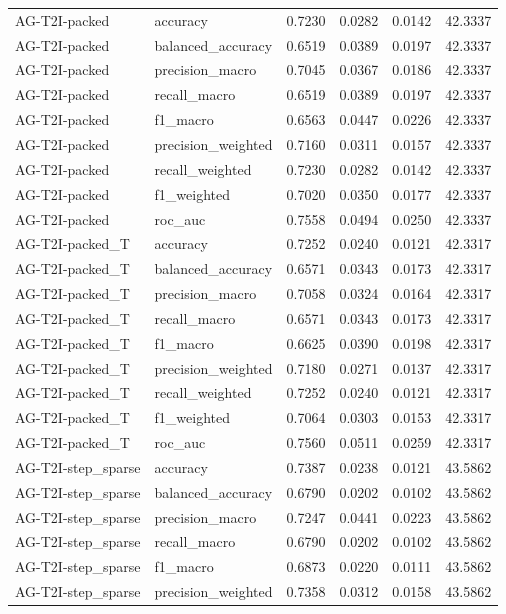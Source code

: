 \begin{tabular}{llrrrr}
AG-T2I-packed & accuracy & 0.7230 & 0.0282 & 0.0142 & 42.3337 \\
AG-T2I-packed & balanced_accuracy & 0.6519 & 0.0389 & 0.0197 & 42.3337 \\
AG-T2I-packed & precision_macro & 0.7045 & 0.0367 & 0.0186 & 42.3337 \\
AG-T2I-packed & recall_macro & 0.6519 & 0.0389 & 0.0197 & 42.3337 \\
AG-T2I-packed & f1_macro & 0.6563 & 0.0447 & 0.0226 & 42.3337 \\
AG-T2I-packed & precision_weighted & 0.7160 & 0.0311 & 0.0157 & 42.3337 \\
AG-T2I-packed & recall_weighted & 0.7230 & 0.0282 & 0.0142 & 42.3337 \\
AG-T2I-packed & f1_weighted & 0.7020 & 0.0350 & 0.0177 & 42.3337 \\
AG-T2I-packed & roc_auc & 0.7558 & 0.0494 & 0.0250 & 42.3337 \\
AG-T2I-packed_T & accuracy & 0.7252 & 0.0240 & 0.0121 & 42.3317 \\
AG-T2I-packed_T & balanced_accuracy & 0.6571 & 0.0343 & 0.0173 & 42.3317 \\
AG-T2I-packed_T & precision_macro & 0.7058 & 0.0324 & 0.0164 & 42.3317 \\
AG-T2I-packed_T & recall_macro & 0.6571 & 0.0343 & 0.0173 & 42.3317 \\
AG-T2I-packed_T & f1_macro & 0.6625 & 0.0390 & 0.0198 & 42.3317 \\
AG-T2I-packed_T & precision_weighted & 0.7180 & 0.0271 & 0.0137 & 42.3317 \\
AG-T2I-packed_T & recall_weighted & 0.7252 & 0.0240 & 0.0121 & 42.3317 \\
AG-T2I-packed_T & f1_weighted & 0.7064 & 0.0303 & 0.0153 & 42.3317 \\
AG-T2I-packed_T & roc_auc & 0.7560 & 0.0511 & 0.0259 & 42.3317 \\
AG-T2I-step_sparse & accuracy & 0.7387 & 0.0238 & 0.0121 & 43.5862 \\
AG-T2I-step_sparse & balanced_accuracy & 0.6790 & 0.0202 & 0.0102 & 43.5862 \\
AG-T2I-step_sparse & precision_macro & 0.7247 & 0.0441 & 0.0223 & 43.5862 \\
AG-T2I-step_sparse & recall_macro & 0.6790 & 0.0202 & 0.0102 & 43.5862 \\
AG-T2I-step_sparse & f1_macro & 0.6873 & 0.0220 & 0.0111 & 43.5862 \\
AG-T2I-step_sparse & precision_weighted & 0.7358 & 0.0312 & 0.0158 & 43.5862 \\

\end{tabular}

